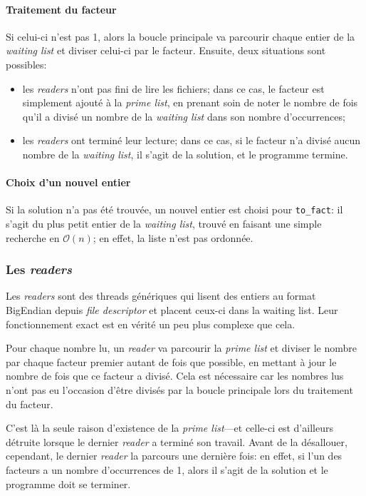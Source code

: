 \documentclass[a4paper,10pt]{article}
\begin{document}
\paragraph{Traitement du facteur}
Si celui-ci n'est pas 1, alors la boucle principale va parcourir chaque entier de la \emph{waiting list} et diviser celui-ci par le facteur. Ensuite, deux situations sont possibles:
\begin{itemize}
    \item les \emph{readers} n'ont pas fini de lire les fichiers; dans ce cas, le facteur est simplement ajouté à la \emph{prime list}, en prenant soin de noter le nombre de fois qu'il a divisé un nombre de la \emph{waiting list} dans son nombre d'occurrences;
    \item les \emph{readers} ont terminé leur lecture; dans ce cas, si le facteur n'a divisé aucun nombre de la \emph{waiting list}, il s'agit de la solution, et le programme termine.
\end{itemize}

\paragraph{Choix d'un nouvel entier}
Si la solution n'a pas été trouvée, un nouvel entier est choisi pour \texttt{to\_fact}: il s'agit du plus petit entier de la \emph{waiting list}, trouvé en faisant une simple recherche en $\mathcal{O}(n)$; en effet, la liste n'est pas ordonnée.

\subsubsection*{Les \emph{readers}}

Les \emph{readers} sont des threads génériques qui lisent des entiers au format BigEndian depuis \emph{file descriptor} et placent ceux-ci dans la waiting list. Leur fonctionnement exact est en vérité un peu plus complexe que cela.

Pour chaque nombre lu, un \emph{reader} va parcourir la \emph{prime list} et diviser le nombre par chaque facteur premier autant de fois que possible, en mettant à jour le nombre de fois que ce facteur a divisé. Cela est nécessaire car les nombres lus n'ont pas eu l'occasion d'être divisés par la boucle principale lors du traitement du facteur.

C'est là la seule raison d'existence de la \emph{prime list}---et celle-ci est d'ailleurs détruite lorsque le dernier \emph{reader} a terminé son travail. Avant de la désallouer, cependant, le dernier \emph{reader} la parcours une dernière fois: en effet, si l'un des facteurs a un nombre d'occurrences de 1, alors il s'agit de la solution et le programme doit se terminer.
\end{document}
